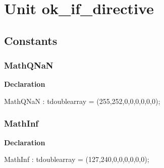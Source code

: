 \documentclass{report}
\newif\ifpdf
\begin{document}
\label{toc}\tableofcontents
\newpage
\newlength{\tmplength}
\chapter{Unit ok{\_}if{\_}directive}
\label{ok_if_directive}
\section{Constants}
\ifpdf
\subsection*{\large{\textbf{MathQNaN}}\normalsize\hspace{1ex}\hrulefill}
\else
\subsection*{MathQNaN}
\fi
\label{ok_if_directive-MathQNaN}
\begin{list}{}{
\setlength{\itemindent}{0cm}
\setlength{\listparindent}{0cm}
\setlength{\leftmargin}{\evensidemargin}
\addtolength{\leftmargin}{\tmplength}
\settowidth{\labelsep}{X}
\addtolength{\leftmargin}{\labelsep}
\setlength{\labelwidth}{\tmplength}
}
\item[\textbf{Declaration}\hfill]
\ifpdf
\begin{flushleft}
\fi
\begin{ttfamily}
MathQNaN : tdoublearray = (255,252,0,0,0,0,0,0);\end{ttfamily}

\ifpdf
\end{flushleft}
\fi

\end{list}
\ifpdf
\subsection*{\large{\textbf{MathInf}}\normalsize\hspace{1ex}\hrulefill}
\else
\subsection*{MathInf}
\fi
\label{ok_if_directive-MathInf}
\begin{list}{}{
\setlength{\itemindent}{0cm}
\setlength{\listparindent}{0cm}
\setlength{\leftmargin}{\evensidemargin}
\addtolength{\leftmargin}{\tmplength}
\settowidth{\labelsep}{X}
\addtolength{\leftmargin}{\labelsep}
\setlength{\labelwidth}{\tmplength}
}
\item[\textbf{Declaration}\hfill]
\ifpdf
\begin{flushleft}
\fi
\begin{ttfamily}
MathInf : tdoublearray = (127,240,0,0,0,0,0,0);\end{ttfamily}

\ifpdf
\end{flushleft}
\fi

\end{list}
\ifpdf
\end{document}
